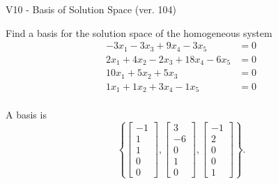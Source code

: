 \begin{exercise}
  \begin{exerciseTitle}V10 - Basis of Solution Space (ver. 104)\end{exerciseTitle}
  \begin{exerciseStatement}
    Find a basis for the solution space of the homogeneous system 
\begin{align*}
 -3 x_ 1 -3 x_ 3 + 9 x_ 4 -3 x_ 5 &= 0  \\ 
  2 x_ 1 + 4 x_ 2 -2 x_ 3 + 18 x_ 4 -6 x_ 5 &= 0  \\ 
  10 x_ 1 + 5 x_ 2 + 5 x_ 3 &= 0  \\ 
  1 x_ 1 + 1 x_ 2 + 3 x_ 4 -1 x_ 5 &= 0  \\ 
 \end{align*}


 
  \end{exerciseStatement}

  \begin{exerciseAnswer}
   A basis is   
\[\left\{\left[\begin{array}{c}
-1 \\
1 \\
1 \\
0 \\
0
\end{array}\right] , \left[\begin{array}{c}
3 \\
-6 \\
0 \\
1 \\
0
\end{array}\right] , \left[\begin{array}{c}
-1 \\
2 \\
0 \\
0 \\
1
\end{array}\right]\right\}.\]

  


  \end{exerciseAnswer}
\end{exercise}